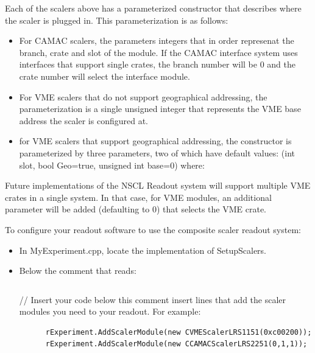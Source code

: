 	 Each of the scalers above has a parameterized constructor that describes
	 where the scaler is plugged in.  This parameterization is as follows:
	 \begin{itemize}
	    \item For CAMAC scalers, the parameters integers that in order represenat the
	       branch, crate and slot of the module.  If the CAMAC interface system uses
	       interfaces that support single crates, the branch number will be 0 and
	       the crate number will select the interface module.
	    \item For VME scalers that do not support geographical addressing, the 
	       parameterization is
	       a single unsigned integer that represents the VME base address the scaler is
	       configured at.
	    \item for VME scalers that support geographical addressing, the
	       constructor is parameterized by three parameters, two of which have
	       default values: (int slot, bool Geo=true, unsigned int base=0) where:
	 \end{itemize}
	 
	 Future implementations of the NSCL Readout system will support multiple VME 
	 crates in a single system.  In that case, for VME modules, an additional
	 parameter will be added (defaulting to 0) that selects the VME crate.
	 
	 To configure your readout software to use the 
	 composite scaler readout system:
	 \begin{itemize}
	    \item In MyExperiment.cpp, locate the 
	       implementation of SetupScalers.
	    \item Below the comment that reads:
	   \begin{verbatim}
	      \end{verbatim}
//  Insert your code below this comment
	    insert lines that add the scaler modules you need to your readout.  For example:
	    \begin{verbatim}
      rExperiment.AddScalerModule(new CVMEScalerLRS1151(0xc00200));
      rExperiment.AddScalerModule(new CCAMACScalerLRS2251(0,1,1));
	    \end{verbatim}
	 \end{itemize}
	 
